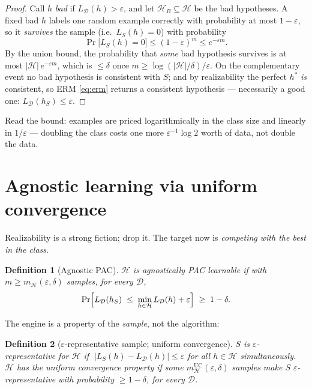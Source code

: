 \documentclass[11pt]{article}
\newtheorem{definition}{Definition}
\newcommand{\D}{\mathcal{D}}
\newcommand{\Hyp}{\mathcal{H}}
\newcommand{\err}{L_{\D}}
\newcommand{\emperr}{L_{S}}
\begin{document}
\begin{proof}
Call $h$ \emph{bad} if $\err(h) > \varepsilon$, and let
$\Hyp_B \subseteq \Hyp$ be the bad hypotheses. A fixed bad $h$ labels one
random example correctly with probability at most $1-\varepsilon$, so it
\emph{survives} the sample (i.e.\ $\emperr(h)=0$) with probability
\begin{equation*}
  \Pr\bigl[\emperr(h) = 0\bigr]
  \le (1-\varepsilon)^m \le e^{-\varepsilon m} .
\end{equation*}
By the union bound, the probability that \emph{some} bad hypothesis
survives is at most $|\Hyp|\, e^{-\varepsilon m}$, which is $\le \delta$
once $m \ge \log(|\Hyp|/\delta)/\varepsilon$. On the complementary event
no bad hypothesis is consistent with $S$; and by realizability the perfect
$h^\ast$ \emph{is} consistent, so ERM \eqref{eq:erm} returns a consistent
hypothesis --- necessarily a good one: $\err(h_S)\le\varepsilon$.
\end{proof}

Read the bound: examples are priced logarithmically in the class size and
linearly in $1/\varepsilon$ --- doubling the class costs one more
$\varepsilon^{-1}\log 2$ worth of data, not double the data.

\section{Agnostic learning via uniform convergence}

Realizability is a strong fiction; drop it. The target now is
\emph{competing with the best in the class}.

\begin{definition}[Agnostic PAC]
$\Hyp$ is \emph{agnostically PAC learnable} if with
$m \ge m_{\Hyp}(\varepsilon,\delta)$ samples, for \emph{every} $\D$,
\begin{equation}
  \Pr\Bigl[\err(h_S) \;\le\; \min_{h\in\Hyp}\err(h) + \varepsilon\Bigr]
  \;\ge\; 1-\delta .
  \label{eq:agnostic}
\end{equation}
\end{definition}

The engine is a property of the \emph{sample}, not the algorithm:

\begin{definition}[$\varepsilon$-representative sample; uniform convergence]
$S$ is \emph{$\varepsilon$-representative} for $\Hyp$ if
$\;|\emperr(h) - \err(h)| \le \varepsilon$ for \emph{all} $h \in \Hyp$
simultaneously. $\Hyp$ has the \emph{uniform convergence property} if
some $m^{\mathrm{UC}}_{\Hyp}(\varepsilon,\delta)$ samples make $S$
$\varepsilon$-representative with probability $\ge 1-\delta$, for every
$\D$.
\end{definition}
\end{document}
